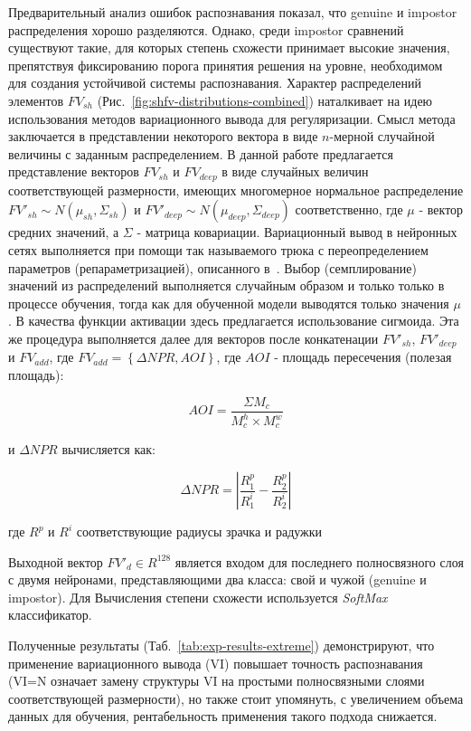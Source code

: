 Предварительный анализ ошибок распознавания показал, что genuine и impostor распределения хорошо разделяются. Однако, среди impostor сравнений существуют такие, для которых степень схожести принимает высокие значения, препятствуя фиксированию порога принятия решения на уровне, необходимом для создания устойчивой системы распознавания. Характер распределений элементов $FV_{sh}$ (Рис.~\ref{fig:shfv-distributions-combined}) наталкивает на идею использования методов вариационного вывода для регуляризации. Смысл метода заключается в представлении некоторого вектора в виде $n$-мерной случайной величины с заданным  распределением. В данной работе предлагается представление векторов $FV_{sh}$ и $FV_{deep}$ в виде случайных величин соответствующей размерности, имеющих многомерное нормальное распределение $FV'_{sh}\sim N(\mu_{sh},\Sigma_{sh})$ и $FV'_{deep}\sim N(\mu_{deep},\Sigma_{deep})$ соответственно, где $\mu$ - вектор средних значений, а $\Sigma$ - матрица ковариации. Вариационный вывод в нейронных сетях выполняется при помощи так называемого трюка с переопределением параметров (репараметризацией), описанного в~\cite{kingma_2015}. Выбор (семплирование) значений из распределений выполняется случайным образом и только только в процессе обучения, тогда как для обученной модели выводятся только значения $\mu$. В качества функции активации здесь предлагается использование сигмоида. Эта же процедура выполняется далее для векторов после конкатенации $ FV'_{sh}$, $FV'_{deep}$ и $FV_{add} $, где $FV_{add}=\left\lbrace{\Delta{NPR},AOI}\right\rbrace$, где $AOI$ - площадь пересечения (полезая площадь):

\begin{equation}
\label{eq:aoi}
AOI=\frac{\Sigma{M_c}}{M^h_c\times M^w_c}
\end{equation}

и $\Delta{NPR}$ вычисляется как:

\begin{equation}
\label{eq:dnpr}
\Delta{NPR}=\left|\frac{R^p_1}{R^i_1}-\frac{R^p_2}{R^i_2}\right|
\end{equation}

где $R^p$ и $R^i$ соответствующие радиусы зрачка и радужки

Выходной вектор $FV'_d\in R^{128}$ является входом для последнего полносвязного слоя с двумя нейронами, представляющими два класса: свой и чужой (genuine и impostor). Для Вычисления степени схожести используется \textit{SoftMax} классификатор.

Полученные результаты (Таб.~\ref{tab:exp-results-extreme}) демонстрируют, что применение вариационного вывода (VI) повышает точность распознавания (VI=N означает замену структуры VI на простыми полносвязными слоями соответствующей размерности), но также стоит упомянуть, с увеличением объема данных для обучения, рентабельность применения такого подхода снижается.


